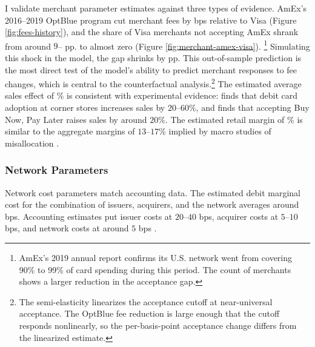 \documentclass[main.tex]{subfiles}
\begin{document}
I validate merchant parameter estimates against three types of evidence.
AmEx's 2016--2019 OptBlue program cut merchant fees by  bps relative to Visa (Figure \ref{fig:fees-history}), and the share of Visa merchants not accepting AmEx shrank from around $9$-- pp. to almost zero (Figure \ref{fig:merchant-amex-visa}).
\footnote{
    AmEx's 2019 annual report confirms its U.S. network went from covering 90\% to 99\% of card spending during this period.
    The count of merchants \textcite{Nilson2020d} shows a larger reduction in the acceptance gap.
}
Simulating this shock in the model, the gap shrinks by  pp.
This out-of-sample prediction is the most direct test of the model's ability to predict merchant responses to fee changes, which is central to the counterfactual analysis.\footnote{The semi-elasticity linearizes the acceptance cutoff at near-universal acceptance.
The OptBlue fee reduction is large enough that the cutoff responds nonlinearly, so the per-basis-point acceptance change differs from the linearized estimate.}
The estimated average sales effect of \% is consistent with experimental evidence: \textcite{Higgins2022} finds that debit card adoption at corner stores increases sales by $20$--$60\%$, and \textcite{Berg.etal2024} finds that accepting Buy Now, Pay Later raises sales by around $20\%$.
The estimated retail margin of \% is similar to the aggregate margins of $13$--$17\%$ implied by macro studies of misallocation \parencite{Edmond.etal2022, Sraer.Thesmar2023a}.

\subsubsection{Network Parameters}
\label{subsubsec:network-gof}

Network cost parameters match accounting data.
The estimated debit marginal cost for the combination of issuers, acquirers, and the network averages around  bps.
Accounting estimates put issuer costs at $20$--$40$ bps, acquirer costs at $5$--$10$ bps, and network costs at around $5$ bps \parencite{Lowe2005, Mukharlyamov.Sarin2025, NACHA2017, Visa2020}.
\end{document}
